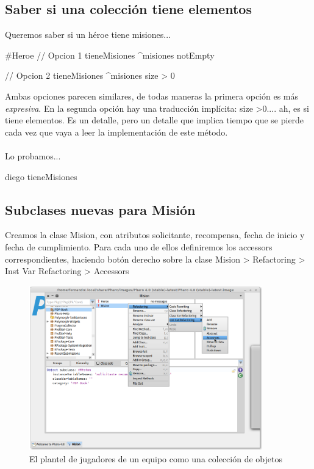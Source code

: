 \documentclass[a4paper,12pt]{book}
\begin{document}
\subsection{Saber si una colección tiene elementos}
Queremos saber si un héroe tiene misiones...

\begin{code}
#Heroe
// Opcion 1
tieneMisiones
    ^misiones notEmpty
\end{code}

    
\begin{code}
// Opcion 2
tieneMisiones
    ^misiones size > 0
\end{code}

Ambas opciones parecen similares, de todas maneras la primera opción es más \textit{expresiva}. En la segunda
opción hay una traducción implícita: size \textgreater  0.... ah, es si tiene elementos. Es un detalle, 
pero un detalle que implica tiempo que se pierde cada vez que vaya a leer la implementación de este método.
\\
\\
Lo probamos...
\begin{code}
diego tieneMisiones
\end{code}

\subsection{Subclases nuevas para Misión}
Creamos la clase Mision, con atributos solicitante, recompensa, fecha de inicio y fecha de cumplimiento. 
Para cada uno de ellos definiremos los accessors correspondientes, haciendo botón derecho sobre la clase
Mision > Refactoring > Inst Var Refactoring > Accessors 
\begin{figure}[h!]
    \centering
    \includegraphics[width=0.9\textwidth]{images/10_accessors.png}
    \caption{El plantel de jugadores de un equipo como una colección de objetos}
\end{figure}
\end{document}
